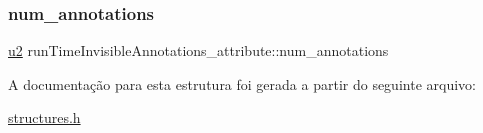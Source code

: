 \subsubsection{\texorpdfstring{num\+\_\+annotations}{num\_annotations}}
{\footnotesize\ttfamily \hyperlink{lista__operandos_8h_a732cde1300aafb73b0ea6c2558a7a54f}{u2} run\+Time\+Invisible\+Annotations\+\_\+attribute\+::num\+\_\+annotations}



A documentação para esta estrutura foi gerada a partir do seguinte arquivo\+:\begin{DoxyCompactItemize}
\item 
\hyperlink{structures_8h}{structures.\+h}\end{DoxyCompactItemize}
